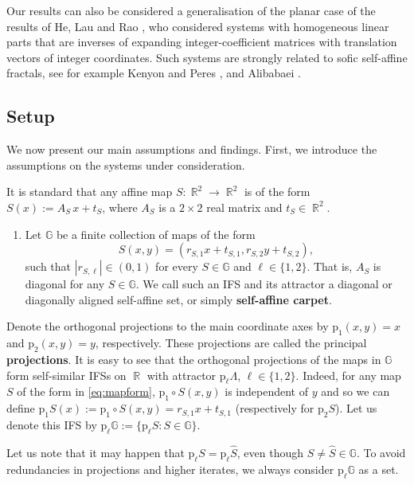\documentclass[a4paper, 11pt]{article}
\DeclareMathOperator{\R}{\mathbb{R}}
\numberwithin{equation}{section}
\theoremstyle{plain}
\theoremstyle{remark}
\theoremstyle{definition}
\begin{document}
Our results can also be considered a generalisation of the planar case of the results of He, Lau and Rao \cite{He2003}, who considered systems with homogeneous linear parts that are inverses of expanding integer-coefficient matrices with translation vectors of integer coordinates. Such systems are strongly related to sofic self-affine fractals, see for example Kenyon and Peres \cite{Kenyon1996, MR1389626}, and Alibabaei \cite{alibabaei2024exacthausdorffdimensionsofic}.

\subsection{Setup}
We now present our main assumptions and findings. First, we introduce the assumptions on the systems under consideration.

It is standard that any affine map $S:\R^2 \to \R^2$ is of the form $S(x) := A_S\,x+t_S$, where $A_S$ is a $2\times2$ real matrix and $t_S\in \R^2$.

\begin{enumerate}[label = $\circ$, ref= self-affine carpet]
	\item \label{A1} Let $\mathbb{G}$ be a finite collection of maps of the form
\begin{equation}\label{eq:mapform}
S(x,y)=\left(r_{S,1}x+t_{S,1},r_{S,2}y+t_{S,2}\right),
\end{equation}
such that $|r_{S,\ell}|\in(0,1)$ for every $S\in\mathbb{G}$ and $\ell\in\{1,2\}$. That is, $A_S$ is diagonal for any $S \in \mathbb{G}$. We call such an IFS and its attractor a diagonal or diagonally aligned self-affine set, or simply \textbf{self-affine carpet}.
\end{enumerate}

Denote the orthogonal projections to the main coordinate axes by $\mathrm{p}_1(x,y)=x$ and $\mathrm{p}_2(x,y)=y$, respectively. These projections are called the principal \textbf{projections}. It is easy to see that the orthogonal projections of the maps in $\mathbb{G}$ form self-similar IFSs on $\R$ with attractor $\mathrm{p}_\ell\Lambda$, $\ell \in \{1,2\}$. Indeed, for any map $S$ of the form in \eqref{eq:mapform}, $\mathrm{p}_1\circ S(x,y)$ is independent of $y$ and so we can define $\mathrm{p}_1S(x):=\mathrm{p}_1\circ S(x,y)=r_{S,1}x+t_{S,1}$ (respectively for $\mathrm{p}_2S$). Let us denote this IFS by $\mathrm{p}_\ell\mathbb{G}:=\{\mathrm{p}_{\ell}S: S\in\mathbb{G}\}$. 

Let us note that it may happen that $\mathrm{p}_\ell S = \mathrm{p}_\ell\hat{S}$, even though $S\neq\hat{S}\in\mathbb{G}$. To avoid redundancies in projections and higher iterates, we always consider $\mathrm{p}_\ell\mathbb{G}$ as a set.
\end{document}
